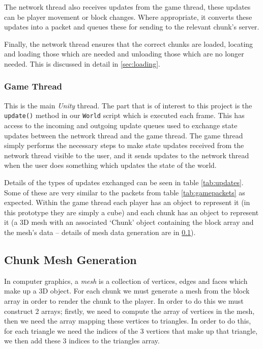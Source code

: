 \documentclass[10pt,twoside,notitlepage,a4paper]{report}
\newcommand{\unity}{\emph{Unity}}
\begin{document}
	The network thread also receives updates from the game thread, these updates can be player movement or block changes. Where appropriate, it converts these updates into a packet and queues these for sending to the relevant chunk's server.
	
	Finally, the network thread ensures that the correct chunks are loaded, locating and loading those which are needed and unloading those which are no longer needed. This is discussed in detail in \cref{sec:loading}.
	
	\subsubsection{Game Thread}
	This is the main \unity{} thread. The part that is of interest to this project is the \texttt{update()} method in our \texttt{World} script which is executed each frame. This has access to the incoming and outgoing update queues used to exchange state updates between the network thread and the game thread. The game thread simply performs the necessary steps to make state updates received from the network thread visible to the user, and it sends updates to the network thread when the user does something which updates the state of the world.
	
	Details of the types of updates exchanged can be seen in table \ref{tab:updates}. Some of these are very similar to the packets from table \ref{tab:gamepackets} as expected. Within the game thread each player has an object to represent it (in this prototype they are simply a cube) and each chunk has an object to represent it (a 3D mesh with an associated `Chunk' object containing the block array and the mesh's data -- details of mesh data generation are in \cref{sec:mesh}).
	
	\subsection{Chunk Mesh Generation}
	\label{sec:mesh}
	In computer graphics, a \emph{mesh} is a collection of vertices, edges and faces which make up a 3D object. For each chunk we must generate a mesh from the block array in order to render the chunk to the player. In order to do this we must construct 2 arrays; firstly, we need to compute the array of vertices in the mesh, then we need the array mapping these vertices to triangles. In order to do this, for each triangle we need the indices of the 3 vertices that make up that triangle, we then add these 3 indices to the triangles array.
	
\end{document}
